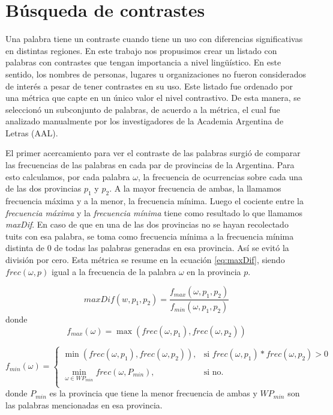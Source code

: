 \section{Búsqueda de contrastes}

Una palabra tiene un contraste cuando tiene un uso con diferencias significativas en
distintas regiones. En este trabajo nos propusimos crear un listado con palabras con contrastes que tengan
importancia a nivel lingüístico. En este sentido, los nombres de personas, lugares u organizaciones no 
fueron considerados de interés a pesar de tener contrastes en su uso.
Este listado fue ordenado por una métrica que capte en un único valor el nivel contrastivo. De esta manera, 
se seleccionó un subconjunto de palabras, de acuerdo a la métrica, el cual fue analizado manualmente por los investigadores de la Academia Argentina de Letras (AAL).

El primer acercamiento para ver el contraste de las palabras surgió de comparar las frecuencias de las palabras 
en cada par de provincias de la Argentina. Para esto calculamos, por cada palabra $\omega$, la frecuencia de ocurrencias sobre cada una de las dos provincias $p_1$ y $p_2$. A la mayor frecuencia de ambas, la llamamos frecuencia máxima y a la menor, la frecuencia mínima. Luego el cociente entre la \textit{frecuencia máxima} y la \textit{frecuencia mínima} tiene como resultado lo que llamamos \textit{maxDif}. En caso de que en una de las dos provincias no se hayan recolectado tuits con esa palabra, se toma como frecuencia mínima a la frecuencia mínima distinta de 0 de todas las palabras generadas en esa provincia. Así se evitó la división por cero. Esta métrica se resume en la ecuación \ref{eq:maxDif}, siendo $frec(\omega,p)$ igual a la frecuencia de la palabra $\omega$ en la provincia $p$.


\begin{equation}
  \label{eq:maxDif} 
  maxDif(w,p_1,p_2) = \frac{f_{max}(\omega,p_1,p_2)}{f_{min}(\omega,p_1,p_2)}
\end{equation}
donde 
\begin{equation}
f_{max}(\omega) = \max (frec(\omega,p_1),frec(\omega,p_2))
\end{equation}

\begin{equation}
 f_{min}(\omega) = \left\{ \begin{array}{lll}
             \min \left(frec\left(\omega,p_1\right),frec\left(\omega,p_2\right)\right), & \text{si } frec(\omega,p_1) * frec(\omega,p_2) > 0  & \\
             \\
             \min\limits_{\omega \in WP_{min}} frec\left(\omega,P_{min}\right) , &  \text{si no.} &  \\
             \end{array}
   \right.
\end{equation}
   donde $P_{min}$ es la provincia que tiene la menor frecuencia de ambas y $WP_{min}$ son las palabras mencionadas en esa provincia.



